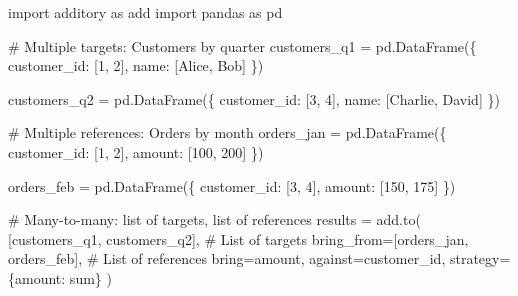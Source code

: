 \documentclass[
  letterpaper,
]{scrbook}
\newenvironment{Shaded}{\begin{snugshade}}{\end{snugshade}}
\newcommand{\CommentTok}[1]{\textcolor[rgb]{0.37,0.37,0.37}{#1}}
\newcommand{\DecValTok}[1]{\textcolor[rgb]{0.68,0.00,0.00}{#1}}
\newcommand{\ImportTok}[1]{\textcolor[rgb]{0.00,0.46,0.62}{#1}}
\newcommand{\NormalTok}[1]{\textcolor[rgb]{0.00,0.23,0.31}{#1}}
\newcommand{\OperatorTok}[1]{\textcolor[rgb]{0.37,0.37,0.37}{#1}}
\newcommand{\StringTok}[1]{\textcolor[rgb]{0.13,0.47,0.30}{#1}}
\begin{document}
\begin{Shaded}
\begin{Highlighting}[]
\ImportTok{import}\NormalTok{ additory }\ImportTok{as}\NormalTok{ add}
\ImportTok{import}\NormalTok{ pandas }\ImportTok{as}\NormalTok{ pd}

\CommentTok{\# Multiple targets: Customers by quarter}
\NormalTok{customers\_q1 }\OperatorTok{=}\NormalTok{ pd.DataFrame(\{}
    \StringTok{\textquotesingle{}customer\_id\textquotesingle{}}\NormalTok{: [}\DecValTok{1}\NormalTok{, }\DecValTok{2}\NormalTok{],}
    \StringTok{\textquotesingle{}name\textquotesingle{}}\NormalTok{: [}\StringTok{\textquotesingle{}Alice\textquotesingle{}}\NormalTok{, }\StringTok{\textquotesingle{}Bob\textquotesingle{}}\NormalTok{]}
\NormalTok{\})}

\NormalTok{customers\_q2 }\OperatorTok{=}\NormalTok{ pd.DataFrame(\{}
    \StringTok{\textquotesingle{}customer\_id\textquotesingle{}}\NormalTok{: [}\DecValTok{3}\NormalTok{, }\DecValTok{4}\NormalTok{],}
    \StringTok{\textquotesingle{}name\textquotesingle{}}\NormalTok{: [}\StringTok{\textquotesingle{}Charlie\textquotesingle{}}\NormalTok{, }\StringTok{\textquotesingle{}David\textquotesingle{}}\NormalTok{]}
\NormalTok{\})}

\CommentTok{\# Multiple references: Orders by month}
\NormalTok{orders\_jan }\OperatorTok{=}\NormalTok{ pd.DataFrame(\{}
    \StringTok{\textquotesingle{}customer\_id\textquotesingle{}}\NormalTok{: [}\DecValTok{1}\NormalTok{, }\DecValTok{2}\NormalTok{],}
    \StringTok{\textquotesingle{}amount\textquotesingle{}}\NormalTok{: [}\DecValTok{100}\NormalTok{, }\DecValTok{200}\NormalTok{]}
\NormalTok{\})}

\NormalTok{orders\_feb }\OperatorTok{=}\NormalTok{ pd.DataFrame(\{}
    \StringTok{\textquotesingle{}customer\_id\textquotesingle{}}\NormalTok{: [}\DecValTok{3}\NormalTok{, }\DecValTok{4}\NormalTok{],}
    \StringTok{\textquotesingle{}amount\textquotesingle{}}\NormalTok{: [}\DecValTok{150}\NormalTok{, }\DecValTok{175}\NormalTok{]}
\NormalTok{\})}

\CommentTok{\# Many{-}to{-}many: list of targets, list of references}
\NormalTok{results }\OperatorTok{=}\NormalTok{ add.to(}
\NormalTok{    [customers\_q1, customers\_q2],           }\CommentTok{\# List of targets}
\NormalTok{    bring\_from}\OperatorTok{=}\NormalTok{[orders\_jan, orders\_feb],    }\CommentTok{\# List of references}
\NormalTok{    bring}\OperatorTok{=}\StringTok{\textquotesingle{}amount\textquotesingle{}}\NormalTok{,}
\NormalTok{    against}\OperatorTok{=}\StringTok{\textquotesingle{}customer\_id\textquotesingle{}}\NormalTok{,}
\NormalTok{    strategy}\OperatorTok{=}\NormalTok{\{}\StringTok{\textquotesingle{}amount\textquotesingle{}}\NormalTok{: }\StringTok{\textquotesingle{}sum\textquotesingle{}}\NormalTok{\}}
\NormalTok{)}


\end{Highlighting}
\end{Shaded}
\end{document}
